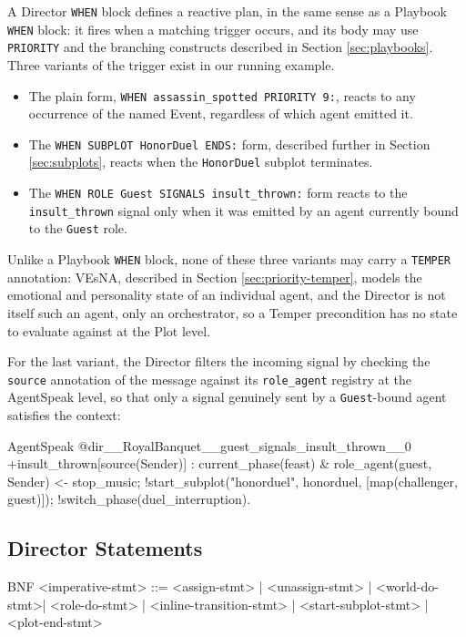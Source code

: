 A Director \lstinline|WHEN| block defines a reactive plan, in the same sense as a Playbook \lstinline|WHEN| block: it fires when a matching trigger occurs, and its body may use \lstinline|PRIORITY| and the branching constructs described in Section \ref{sec:playbooks}. Three variants of the trigger exist in our running example. 

\begin{itemize}
    \item The plain form, \lstinline|WHEN assassin_spotted PRIORITY 9:|, reacts to any occurrence of the named Event, regardless of which agent emitted it.
    \item The \lstinline|WHEN SUBPLOT HonorDuel ENDS:| form, described further in Section \ref{sec:subplots}, reacts when the \lstinline|HonorDuel| subplot terminates.
        \item The \lstinline|WHEN ROLE Guest SIGNALS insult_thrown:| form reacts to the \lstinline|insult_thrown| signal only when it was emitted by an agent currently bound to the \lstinline|Guest| role.
\end{itemize}  

Unlike a Playbook \lstinline|WHEN| block, none of these three variants may carry a \lstinline|TEMPER| annotation: VEsNA, described in Section \ref{sec:priority-temper}, models the emotional and personality state of an individual agent, and the Director is not itself such an agent, only an orchestrator, so a Temper precondition has no state to evaluate against at the Plot level.

For the last variant, the Director filters the incoming signal by checking the \lstinline|source| annotation of the message against its \lstinline|role_agent| registry at the AgentSpeak level, so that only a signal genuinely sent by a \lstinline|Guest|-bound agent satisfies the context:

\begin{codeblock}[]{AgentSpeak}
@dir__RoyalBanquet__guest_signals_insult_thrown__0
+insult_thrown[source(Sender)] : current_phase(feast)
    & role_agent(guest, Sender) <-
    stop_music;
    !start_subplot("honorduel", honorduel, [map(challenger, guest)]);
    !switch_phase(duel_interruption).
\end{codeblock}

\subsection{Director Statements}
\begin{codeblock}[]{BNF}
    <imperative-stmt>   ::= <assign-stmt> | <unassign-stmt> 
                          | <world-do-stmt>| <role-do-stmt> 
                          | <inline-transition-stmt>
                          | <start-subplot-stmt> | <plot-end-stmt>
\end{codeblock}

